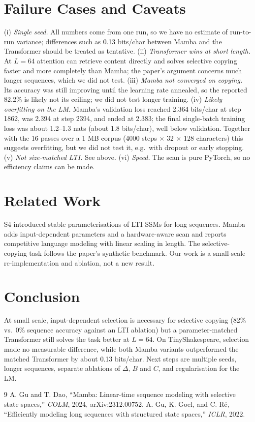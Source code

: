 \documentclass[10pt,twocolumn]{article}
\begin{document}
\section{Failure Cases and Caveats}
(i) \emph{Single seed.} All numbers come from one run, so we have no estimate of run-to-run variance; differences such as 0.13 bits/char between Mamba and the Transformer should be treated as tentative. (ii) \emph{Transformer wins at short length.} At $L{=}64$ attention can retrieve content directly and solves selective copying faster and more completely than Mamba; the paper's argument concerns much longer sequences, which we did not test. (iii) \emph{Mamba not converged on copying.} Its accuracy was still improving until the learning rate annealed, so the reported 82.2\% is likely not its ceiling; we did not test longer training. (iv) \emph{Likely overfitting on the LM.} Mamba's validation loss reached 2.364 bits/char at step 1862, was 2.394 at step 2394, and ended at 2.383; the final single-batch training loss was about 1.2--1.3 nats (about 1.8 bits/char), well below validation. Together with the 16 passes over a 1 MB corpus (4000 steps $\times$ 32 $\times$ 128 characters) this suggests overfitting, but we did not test it, e.g.\ with dropout or early stopping. (v) \emph{Not size-matched LTI.} See above. (vi) \emph{Speed.} The scan is pure PyTorch, so no efficiency claims can be made.

\section{Related Work}
S4 \cite{s4} introduced stable parameterisations of LTI SSMs for long sequences. Mamba \cite{gu2023mamba} adds input-dependent parameters and a hardware-aware scan and reports competitive language modeling with linear scaling in length. The selective-copying task follows the paper's synthetic benchmark. Our work is a small-scale re-implementation and ablation, not a new result.

\section{Conclusion}
At small scale, input-dependent selection is necessary for selective copying (82\% vs.\ 0\% sequence accuracy against an LTI ablation) but a parameter-matched Transformer still solves the task better at $L{=}64$. On TinyShakespeare, selection made no measurable difference, while both Mamba variants outperformed the matched Transformer by about 0.13 bits/char. Next steps are multiple seeds, longer sequences, separate ablations of $\Delta$, $B$ and $C$, and regularisation for the LM.

\begin{thebibliography}{9}\small
{} A. Gu and T. Dao, ``Mamba: Linear-time sequence modeling with selective state spaces,'' \emph{COLM}, 2024, arXiv:2312.00752.
 A. Gu, K. Goel, and C. R\'e, ``Efficiently modeling long sequences with structured state spaces,'' \emph{ICLR}, 2022.
\end{thebibliography}
\end{document}
